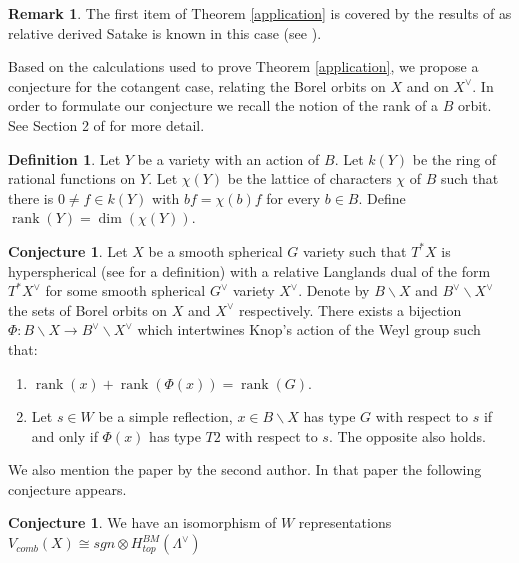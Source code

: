 \documentclass[12pt]{article}
\theoremstyle{plain}
\theoremstyle{definition}
\newtheorem{conj}[theorem]{Conjecture}
\newtheorem{Remark}[theorem]{Remark}
\newtheorem{defn}[theorem]{Definition}
\begin{document}
\begin{Remark}
    The first item of Theorem \ref{application} is covered by the results of \cite{braverman2026relativelanglandsdualitykoszul} as relative derived Satake is known in this case (see \cite{Braverman_Finkelberg_Ginzburg_Travkin_2021}).
\end{Remark}

Based on the calculations used to prove Theorem \ref{application}, we propose a conjecture for the cotangent case, relating the Borel orbits on $X$ and on $X^\vee$. In order to formulate our conjecture we recall the notion of the rank of a $B$ orbit. See Section 2 of \cite{knop} for more detail.

\begin{defn}\label{Borel rank}
    Let $Y$ be a variety with an action of $B$. Let $k(Y)$ be the ring of rational functions on $Y$. Let $\chi(Y)$ be the lattice of characters $\chi$ of $B$ such that there is $0\neq f\in k(Y)$ with $bf=\chi(b)f$ for every $b\in B$. Define $\operatorname{rank}(Y)=\dim(\chi(Y))$.
\end{defn}

\begin{conj}
    Let $X$ be a smooth spherical $G$ variety such that $T^*X$ is hyperspherical (see \cite{benzvi2024relativelanglandsduality} for a definition) with a relative Langlands dual of the form $T^*X^\vee$ for some smooth spherical $G^\vee$ variety $X^\vee$. Denote by $B\backslash X$ and $B^\vee\backslash X^\vee$ the sets of Borel orbits on $X$ and $X^\vee$ respectively. There exists a bijection $\Phi:B\backslash X\rightarrow B^\vee\backslash X^\vee$ which intertwines Knop's action of the Weyl group such that:
    \begin{enumerate}
        \item $\operatorname{rank}(x)+\operatorname{rank}(\Phi(x))=\operatorname{rank}(G)$.
        \item Let $s\in W$ be a simple reflection, $x\in B\backslash X$ has type $G$ with respect to $s$ if and only if $\Phi(x)$ has type $T2$ with respect to $s$. The opposite also holds.
    \end{enumerate}
\end{conj}

We also mention the paper \cite{shtotland2026relativekazhdanlusztigisomorphism} by the second author. In that paper the following conjecture appears.

\begin{conj}\label{second conj}
    We have an isomorphism of $W$ representations $V_{comb}(X)\cong sgn\otimes H^{BM}_{top}(\Lambda^\vee)$
\end{conj}
\end{document}
